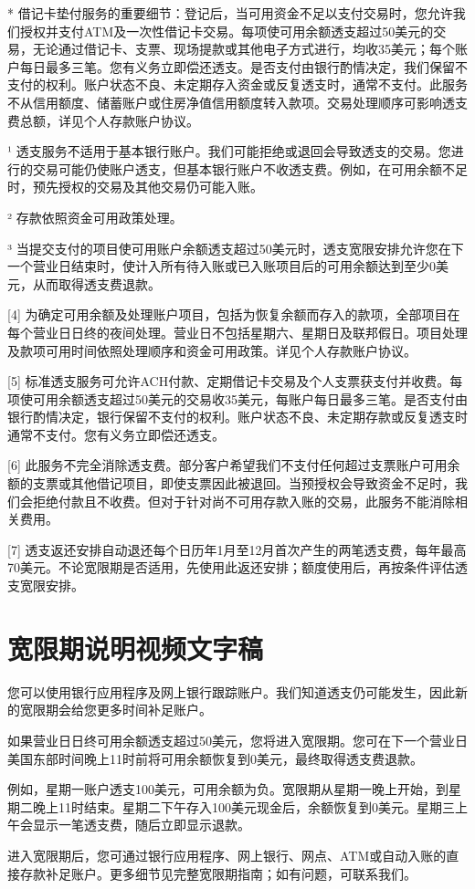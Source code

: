 \documentclass[UTF8,fontset=none,11pt,a4paper]{ctexart}
\begin{document}
* 借记卡垫付服务的重要细节：登记后，当可用资金不足以支付交易时，您允许我们授权并支付ATM及一次性借记卡交易。每项使可用余额透支超过50美元的交易，无论通过借记卡、支票、现场提款或其他电子方式进行，均收35美元；每个账户每日最多三笔。您有义务立即偿还透支。是否支付由银行酌情决定，我们保留不支付的权利。账户状态不良、未定期存入资金或反复透支时，通常不支付。此服务不从信用额度、储蓄账户或住房净值信用额度转入款项。交易处理顺序可影响透支费总额，详见个人存款账户协议。


¹ 透支服务不适用于基本银行账户。我们可能拒绝或退回会导致透支的交易。您进行的交易可能仍使账户透支，但基本银行账户不收透支费。例如，在可用余额不足时，预先授权的交易及其他交易仍可能入账。


² 存款依照资金可用政策处理。


³ 当提交支付的项目使可用账户余额透支超过50美元时，透支宽限安排允许您在下一个营业日结束时，使计入所有待入账或已入账项目后的可用余额达到至少0美元，从而取得透支费退款。


[4] 为确定可用余额及处理账户项目，包括为恢复余额而存入的款项，全部项目在每个营业日日终的夜间处理。营业日不包括星期六、星期日及联邦假日。项目处理及款项可用时间依照处理顺序和资金可用政策。详见个人存款账户协议。


[5] 标准透支服务可允许ACH付款、定期借记卡交易及个人支票获支付并收费。每项使可用余额透支超过50美元的交易收35美元，每账户每日最多三笔。是否支付由银行酌情决定，银行保留不支付的权利。账户状态不良、未定期存款或反复透支时通常不支付。您有义务立即偿还透支。


[6] 此服务不完全消除透支费。部分客户希望我们不支付任何超过支票账户可用余额的支票或其他借记项目，即使支票因此被退回。当预授权会导致资金不足时，我们会拒绝付款且不收费。但对于针对尚不可用存款入账的交易，此服务不能消除相关费用。


[7] 透支返还安排自动退还每个日历年1月至12月首次产生的两笔透支费，每年最高70美元。不论宽限期是否适用，先使用此返还安排；额度使用后，再按条件评估透支宽限安排。


\section*{宽限期说明视频文字稿}
您可以使用银行应用程序及网上银行跟踪账户。我们知道透支仍可能发生，因此新的宽限期会给您更多时间补足账户。


如果营业日日终可用余额透支超过50美元，您将进入宽限期。您可在下一个营业日美国东部时间晚上11时前将可用余额恢复到0美元，最终取得透支费退款。


例如，星期一账户透支100美元，可用余额为负。宽限期从星期一晚上开始，到星期二晚上11时结束。星期二下午存入100美元现金后，余额恢复到0美元。星期三上午会显示一笔透支费，随后立即显示退款。


进入宽限期后，您可通过银行应用程序、网上银行、网点、ATM或自动入账的直接存款补足账户。更多细节见完整宽限期指南；如有问题，可联系我们。
\end{document}
